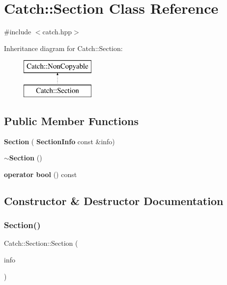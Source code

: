 \section{Catch\+:\+:Section Class Reference}
\label{class_catch_1_1_section}


{\ttfamily \#include $<$catch.\+hpp$>$}

Inheritance diagram for Catch\+:\+:Section\+:\begin{figure}[H]
\begin{center}
\leavevmode
\includegraphics[height=2.000000cm]{class_catch_1_1_section}
\end{center}
\end{figure}
\subsection*{Public Member Functions}
\begin{DoxyCompactItemize}
\item 
\textbf{ Section} (\textbf{ Section\+Info} const \&info)
\item 
\textbf{ $\sim$\+Section} ()
\item 
\textbf{ operator bool} () const
\end{DoxyCompactItemize}


\subsection{Constructor \& Destructor Documentation}
\mbox{\label{class_catch_1_1_section_a68fd4e51e8981aaa7ddb00d8a6abd099}} 
\subsubsection{Section()}
{\footnotesize\ttfamily Catch\+::\+Section\+::\+Section (\begin{DoxyParamCaption}\item[{\textbf{ Section\+Info} const \&}]{info }\end{DoxyParamCaption})}

\mbox{\label{class_catch_1_1_section_aa1422edd68a77aa578b5cc6b8b69f86f}} 
